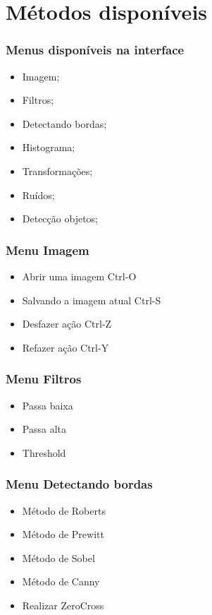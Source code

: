 \documentclass[12pt]{beamer}
\begin{document}
\section{Métodos disponíveis}\label{Métodos disponíveis}
\begin{frame}
    \frametitle{Menus disponíveis na interface}
    \begin{itemize}
        \item Imagem;
        \item Filtros;
        \item Detectando bordas;
        \item Histograma;
        \item Transformações;
        \item Ruídos;
        \item Detecção objetos;
    \end{itemize}
\end{frame}

\begin{frame}
    \frametitle{Menu Imagem}
    \begin{itemize}
        \item Abrir uma imagem Ctrl-O
        \item Salvando a imagem atual Ctrl-S
        \item Desfazer ação Ctrl-Z
        \item Refazer ação Ctrl-Y
    \end{itemize}
\end{frame}

\begin{frame}
    \frametitle{Menu Filtros}
    \begin{itemize}
        \item Passa baixa
        \item Passa alta
        \item Threshold
    \end{itemize}
\end{frame}

\begin{frame}
    \frametitle{Menu Detectando bordas}
    \begin{itemize}
        \item Método de Roberts
        \item Método de Prewitt
        \item Método de Sobel
        \item Método de Canny
        \item Realizar ZeroCross
    \end{itemize}
\end{frame}
\end{document}
